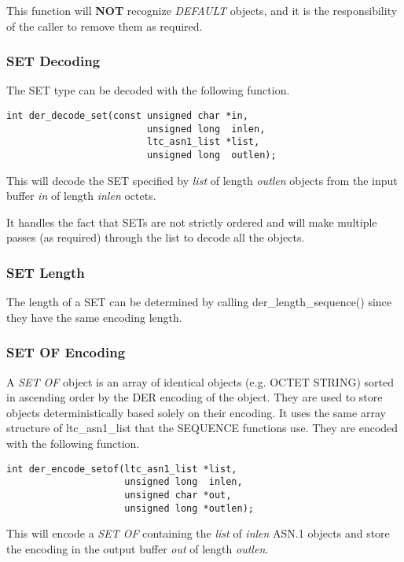 \documentclass[synpaper]{book}
\begin{document}
This function will \textbf{NOT} recognize \textit{DEFAULT} objects, and it is the responsibility of the caller to remove them as required.

\subsubsection{SET Decoding}

The SET type can be decoded with the following function.

\begin{verbatim}
int der_decode_set(const unsigned char *in,
                         unsigned long  inlen,
                         ltc_asn1_list *list,
                         unsigned long  outlen);
\end{verbatim}

This will decode the SET specified by \textit{list} of length \textit{outlen} objects from the input buffer \textit{in} of length \textit{inlen} octets.

It handles the fact that SETs are not strictly ordered and will make multiple passes (as required) through the list to decode all the objects.

\subsubsection{SET Length}
The length of a SET can be determined by calling der\_length\_sequence() since they have the same encoding length.

\subsubsection{SET OF Encoding}
A \textit{SET OF} object is an array of identical objects (e.g. OCTET STRING) sorted in ascending order by the DER encoding of the object.  They are
used to store objects deterministically based solely on their encoding.  It uses the same array structure of ltc\_asn1\_list that the SEQUENCE functions
use.  They are encoded with the following function.

\begin{verbatim}
int der_encode_setof(ltc_asn1_list *list,
                     unsigned long  inlen,
                     unsigned char *out,
                     unsigned long *outlen);
\end{verbatim}

This will encode a \textit{SET OF} containing the \textit{list} of \textit{inlen} ASN.1 objects and store the encoding in the output buffer \textit{out} of length \textit{outlen}.
\end{document}
